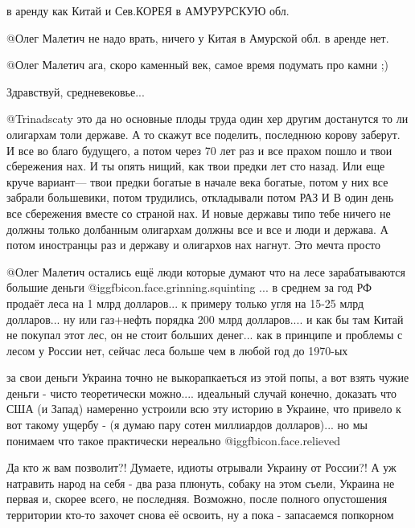 \begin{itemize}
\begin{itemize}

в аренду как  Китай  и Сев.КОРЕЯ в АМУРУРСКУЮ обл.


 @Олег Малетич   не надо врать, ничего у Китая в Амурской обл. в аренде нет.


@Олег Малетич  ага, скоро каменный век, самое время подумать про камни ;)

Здравствуй, средневековье...


@Trinadscaty  это да но основные плоды труда один хер другим достанутся то ли
олигархам толи державе. А то скажут все поделить, последнюю корову заберут. И все
во благо будущего, а потом через 70 лет раз и все прахом пошло и твои
сбережения нах. И ты опять нищий, как твои предки лет сто назад. Или еще круче
вариант— твои предки богатые в начале века богатые, потом у них все забрали
большевики, потом трудились, откладывали потом РАЗ И В один день все сбережения
вместе со страной нах. И новые державы типо тебе ничего не должны только
долбанным олигархам должны все и все и люди и держава. А потом иностранцы раз и
державу и олигархов нах нагнут. Это мечта просто



@Олег Малетич  остались ещё люди которые думают что на лесе зарабатываются
большие деньги @igg{fbicon.face.grinning.squinting} ... в среднем за год РФ продаёт леса на 1 млрд долларов... к
примеру только угля на 15-25 млрд долларов... ну или газ+нефть порядка 200
млрд долларов.... и как бы там Китай не покупал этот лес, он не стоит больших
денег... как в принципе и проблемы с лесом у России нет, сейчас леса больше
чем в любой год до 1970-ых


за свои деньги Украина точно не выкорапкаеться из этой попы, а вот взять чужие
деньги - чисто теоретически можно.... идеальный случай конечно, доказать что
США (и Запад) намеренно устроили всю эту историю в Украине, что привело к вот
такому ущербу - (я думаю пару сотен миллиардов долларов)... но мы понимаем что
такое практически нереально @igg{fbicon.face.relieved} 


Да кто ж вам позволит?! Думаете, идиоты отрывали Украину от России?! А уж
натравить народ на себя - два раза плюнуть, собаку на этом съели, Украина не
первая и, скорее всего, не последняя. Возможно, после полного опустошения
территории кто-то захочет снова её освоить, ну а пока - запасаемся попкорном



\end{itemize}
\end{itemize}
